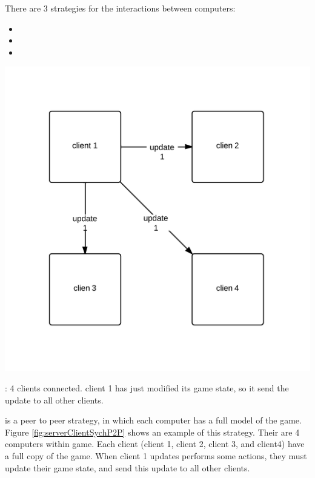 There are 3 strategies for the interactions between computers:
\begin{itemize}
\item \stepOneName
\item \stepTwoName
\item \stepThreeName
\end{itemize}


\begin{marginfigure}
	\includegraphics{res/computer_communication_architecture/ServerClientSynchronizationP2P.png}
	\caption{
	\stepOneName : 4 clients connected. client 1 has just modified its game state, so it send the update to all other clients.
	}
	\label{fig:serverClientSychP2P}
\end{marginfigure}

\stepOneName is a peer to peer strategy, in which each computer has a full model of the game. Figure \ref{fig:serverClientSychP2P} shows an example of this strategy. 
Their are 4 computers within game. Each client (client 1, client 2, client 3, and client4) have a full copy of the game.
When client 1 updates performs some actions, they must update their game state, and send this update to all other clients.

